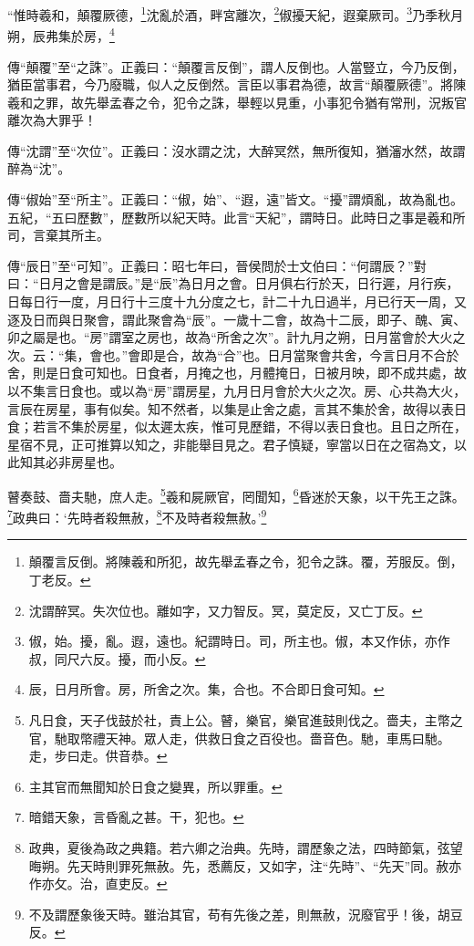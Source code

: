 “惟時羲和，顛覆厥德，\footnote{顛覆言反倒。將陳羲和所犯，故先舉孟春之令，犯令之誅。覆，芳服反。倒，丁老反。}沈亂於酒，畔宮離次，\footnote{沈謂醉冥。失次位也。離如字，又力智反。冥，莫定反，又亡丁反。}俶擾天紀，遐棄厥司。\footnote{俶，始。擾，亂。遐，遠也。紀謂時日。司，所主也。俶，本又作{\hanaa 㑐}，亦作叔，同尺六反。擾，而小反。}乃季秋月朔，辰弗集於房，\footnote{辰，日月所會。房，所舍之次。集，合也。不合即日食可知。}

{\noindent\zhuan{}\fzbyks 傳“顛覆”至“之誅”。正義曰：“顛覆言反倒”，謂人反倒也。人當豎立，今乃反倒，猶臣當事君，今乃廢職，似人之反倒然。言臣以事君為德，故言“顛覆厥德”。將陳羲和之罪，故先舉孟春之令，犯令之誅，舉輕以見重，小事犯令猶有常刑，況叛官離次為大罪乎！ \par}

{\noindent\zhuan{}\fzbyks 傳“沈謂”至“次位”。正義曰：沒水謂之沈，大醉冥然，無所復知，猶瀋水然，故謂醉為“沈”。 \par}

{\noindent\zhuan{}\fzbyks 傳“俶始”至“所主”。正義曰：“俶，始”、“遐，遠”皆文。“擾”謂煩亂，故為亂也。五紀，“五曰歷數”，歷數所以紀天時。此言“天紀”，謂時日。此時日之事是羲和所司，言棄其所主。 \par}

{\noindent\zhuan{}\fzbyks 傳“辰日”至“可知”。正義曰：昭七年曰，晉侯問於士文伯曰：“何謂辰？”對曰：“日月之會是謂辰。”是“辰”為日月之會。日月俱右行於天，日行遲，月行疾，日每日行一度，月日行十三度十九分度之七，計二十九日過半，月已行天一周，又逐及日而與日聚會，謂此聚會為“辰”。一歲十二會，故為十二辰，即子、醜、寅、卯之屬是也。“房”謂室之房也，故為“所舍之次”。計九月之朔，日月當會於大火之次。云：“集，會也。”會即是合，故為“合”也。日月當聚會共舍，今言日月不合於舍，則是日食可知也。日食者，月掩之也，月體掩日，日被月映，即不成共處，故以不集言日食也。或以為“房”謂房星，九月日月會於大火之次。房、心共為大火，言辰在房星，事有似矣。知不然者，以集是止舍之處，言其不集於舍，故得以表日食；若言不集於房星，似太遲太疾，惟可見歷錯，不得以表日食也。且日之所在，星宿不見，正可推算以知之，非能舉目見之。君子慎疑，寧當以日在之宿為文，以此知其必非房星也。 \par}

瞽奏鼓、嗇夫馳，庶人走。\footnote{凡日食，天子伐鼓於社，責上公。瞽，樂官，樂官進鼓則伐之。嗇夫，主幣之官，馳取幣禮天神。眾人走，供救日食之百役也。嗇音色。馳，車馬曰馳。走，步曰走。供音恭。}羲和屍厥官，罔聞知，\footnote{主其官而無聞知於日食之變異，所以罪重。}昏迷於天象，以干先王之誅。\footnote{暗錯天象，言昏亂之甚。干，犯也。}政典曰：‘先時者殺無赦，\footnote{政典，夏後為政之典籍。若六卿之治典。先時，謂歷象之法，四時節氣，弦望晦朔。先天時則罪死無赦。先，悉薦反，又如字，注“先時”、“先天”同。赦亦作亦攵。治，直吏反。}不及時者殺無赦。’\footnote{不及謂歷象後天時。雖治其官，苟有先後之差，則無赦，況廢官乎！後，胡豆反。}

